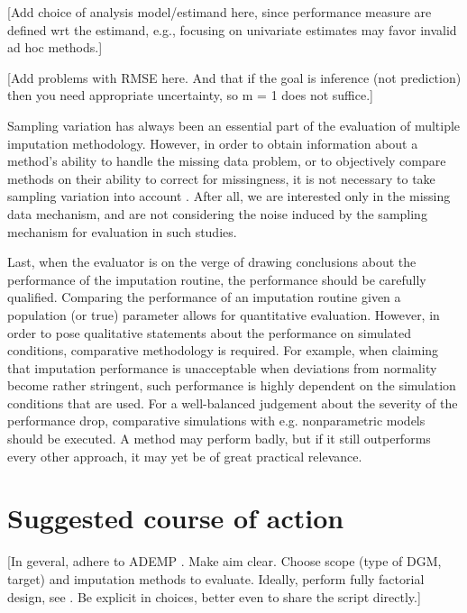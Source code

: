 \documentclass[bimj,fleqn]{w-art}
\theoremstyle{plain}
\theoremstyle{definition}
\begin{document}
[Add choice of analysis model/estimand here, since performance measure are defined wrt the estimand, e.g., focusing on univariate estimates may favor invalid ad hoc methods.]

[Add problems with RMSE here. And that if the goal is inference (not prediction) then you need appropriate uncertainty, so m = 1 does not suffice.]

Sampling variation has always been an essential part of the evaluation of multiple imputation methodology. However, in order to obtain information about a method's ability to handle the missing data problem, or to objectively compare methods on their ability to correct for missingness, it is not necessary to take sampling variation into account \citep{vink14}. After all, we are interested only in the missing data mechanism, and are not considering the noise induced by the sampling mechanism for evaluation in such studies.

Last, when the evaluator is on the verge of drawing conclusions about the performance of the imputation routine, the performance should be carefully qualified. Comparing the performance of an imputation routine given a population (or true) parameter allows for quantitative evaluation. However, in order to pose qualitative statements about the performance on simulated conditions, comparative methodology is required. For example, when claiming that imputation performance is unacceptable when deviations from normality become rather stringent, such performance is highly dependent on the simulation conditions that are used. For a well-balanced judgement about the severity of the performance drop, comparative simulations with e.g. nonparametric models should be executed. A method may perform badly, but if it still outperforms every other approach, it may yet be of great practical relevance.




\section{Suggested course of action}

[In geveral, adhere to ADEMP \citep{morr18}. Make aim clear. Choose scope (type of DGM, target) and imputation methods to evaluate. Ideally, perform fully factorial design, see \citet{morr18}. Be explicit in choices, better even to share the script directly.]
\end{document}
